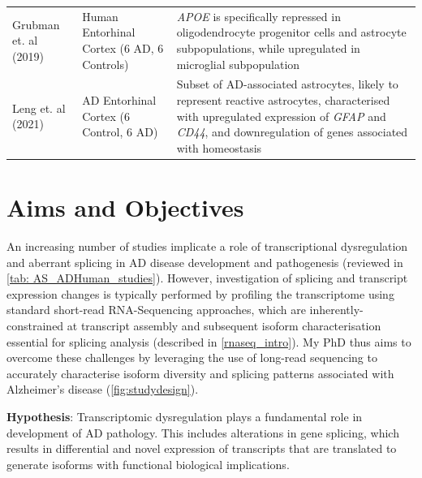 \begin{changemargin}{1.5cm}
\begin{landscape}
\begin{longtable}[c]{p{4cm}p{4cm}p{18cm}}
			\centering Grubman et. al (2019)\cite{Grubman2019} &
			\centering Human Entorhinal Cortex (6 AD, 6 Controls)  &
			\tabitem \textit{APOE} is specifically repressed in oligodendrocyte progenitor cells and astrocyte subpopulations, while upregulated in microglial subpopulation  \\
			\hdashline[0.5pt/5pt]
			
			\centering Leng et. al (2021)\cite{Leng2021} &
			\centering AD Entorhinal Cortex (6 Control, 6 AD)  &
			\tabitem Subset of AD-associated astrocytes, likely to represent reactive astrocytes, characterised with upregulated expression of \textit{GFAP} and \textit{CD44}, and downregulation of genes associated with homeostasis  		
			\\* \bottomrule
		\end{longtable}
	\end{landscape}
\end{changemargin}


\newpage
\section{Aims and Objectives}
An increasing number of studies implicate a role of transcriptional dysregulation and aberrant splicing in AD disease development and pathogenesis (reviewed in \cref{tab: AS_ADHuman_studies}). However, investigation of splicing and transcript expression changes is typically performed by profiling the transcriptome using standard short-read RNA-Sequencing approaches, which are inherently-constrained at transcript assembly and subsequent isoform characterisation essential for splicing analysis (described in \cref{rnaseq_intro}). My PhD thus aims to overcome these challenges by leveraging the use of long-read sequencing to accurately characterise isoform diversity and splicing patterns associated with Alzheimer's disease (\cref{fig:studydesign}).


\textbf{Hypothesis}: Transcriptomic dysregulation plays a fundamental role in development of AD pathology. This includes alterations in gene splicing, which results in differential and novel expression of transcripts that are translated to generate isoforms with functional biological implications. 

